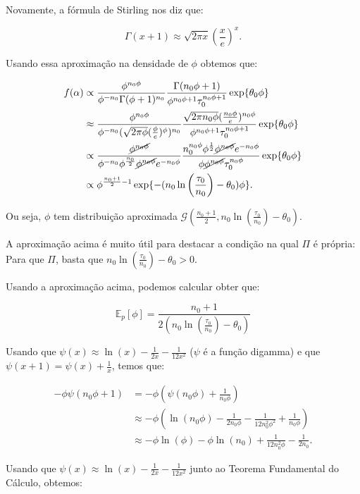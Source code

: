 \documentclass[
]{article}
\begin{document}
Novamente, a fórmula de Stirling nos diz que:

\[
\Gamma(x+1) \approx \sqrt{2\pi x}\left(\frac{x}{e}\right)^x.
\]

Usando essa aproximação na densidade de \(\phi\) obtemos que:

\[
\begin{aligned}
f(\alpha)&\propto \frac{\phi^{n_0\phi}}{\phi^{-n_0}\Gamma(\phi+1)^{n_0}}\frac{\Gamma(n_0\phi+1)}{\phi^{n_0\phi+1}\tau_0^{n_0\phi+1}}\exp\{\theta_0\phi\}\\
&\approx \frac{\phi^{n_0\phi}}{\phi^{-n_0}(\sqrt{2\pi\phi}(\frac{\phi}{e})^{\phi})^{n_0}}\frac{\sqrt{2\pi n_0\phi}(\frac{n_0\phi}{e})^{n_0\phi}}{\phi^{n_0\phi+1}\tau_0^{n_0\phi+1}}\exp\{\theta_0\phi\}\\
&\propto \frac{\cancel{\phi^{n_0\phi}}}{\phi^{-n_0}\phi^{\frac{n_0}{2}}\cancel{\phi^{n_0\phi}}e^{-n_0\phi}}\frac{n_0^{n_0\phi}\phi^{\frac{1}{2}}\cancel{\phi^{n_0\phi}} e^{-n_0\phi}}{\phi\cancel{\phi^{n_0\phi}}\tau_0^{n_0\phi}}\exp\{\theta_0\phi\}\\
&\propto \phi^{\frac{n_0+1}{2}-1}\exp\{-(n_0\ln\left(\frac{\tau_0}{n_0}\right)-\theta_0)\phi\}.
\end{aligned}
\]

Ou seja, \(\phi\) tem distribuição aproximada
\(\mathcal{G}\left(\frac{n_0+1}{2},n_0\ln\left(\frac{\tau_0}{n_0}\right)-\theta_0\right)\).

A aproximação acima é muito útil para destacar a condição na qual
\(\Pi\) é própria: Para que \(\Pi\), basta que
\(n_0\ln\left(\frac{\tau_0}{n_0}\right)-\theta_0>0\).

Usando a aproximação acima, podemos calcular obter que:

\[
\mathbb{E}_{p}[\phi]=\frac{n_0+1}{2\left(n_0\ln\left(\frac{\tau_0}{n_0}\right)-\theta_0\right)}
\]

Usando que \(\psi(x)\approx \ln(x)-\frac{1}{2x}-\frac{1}{12x^2}\)
(\(\psi\) é a função digamma) e que \(\psi(x+1)=\psi(x)+\frac{1}{x}\),
temos que:

\[
\begin{aligned}
-\phi\psi(n_0\phi+1)&=-\phi\left(\psi(n_0\phi)+\frac{1}{n_0\phi}\right)\\
&\approx-\phi\left(\ln(n_0\phi)-\frac{1}{2n_0\phi}-\frac{1}{12n^{2}_0\phi^2}+\frac{1}{n_0\phi}\right)\\
&\approx-\phi\ln(\phi)-\phi\ln(n_0)+\frac{1}{12n^{2}_0\phi}-\frac{1}{2n_0}.
\end{aligned}
\]

Usando que \(\psi(x)\approx \ln(x)-\frac{1}{2x}-\frac{1}{12x^2}\) junto
ao Teorema Fundamental do Cálculo, obtemos:
\end{document}
